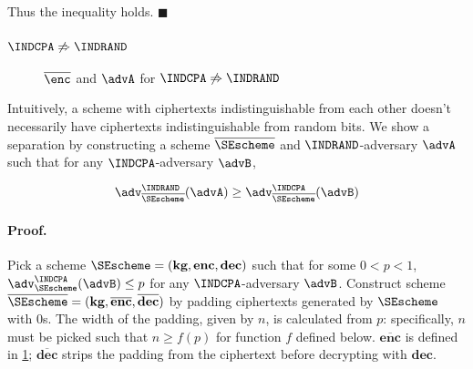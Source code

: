 Thus the inequality holds. $\blacksquare$

\subsubsection*{$\INDCPA \not\Rightarrow \INDRAND$}

\begin{figure}[p]
	\centering
  \caption{$\overline{\enc}$ and $\advA$ for $\INDCPA \not\Rightarrow \INDRAND$}
  \label{fig:cpa-rand-separation}
\end{figure}

Intuitively, a scheme with ciphertexts indistinguishable from each other
doesn't necessarily have ciphertexts indistinguishable from random bits.
We show a separation by constructing a scheme $\overline{\SEscheme}$ and
$\INDRAND$-adversary $\advA$ such that for any $\INDCPA$-adversary $\advB$,

$$
\adv_{\overline{\SEscheme}}^{\INDRAND}(\advA) \geq
\adv_{\overline{\SEscheme}}^{\INDCPA}(\advB)
$$

\paragraph{Proof.}

Pick a scheme $\SEscheme = (\textbf{kg},\textbf{enc},\textbf{dec})$
such that for some $0 < p < 1$, $\adv_{\SEscheme}^{\INDCPA}(\advB) \leq p$
for any $\INDCPA$-adversary $\advB$.
Construct scheme
$\overline{\SEscheme} = (\textbf{kg},\overline{\textbf{enc}},\overline{\textbf{dec}})$
by padding ciphertexts generated by $\SEscheme$ with 0s. The width of the
padding, given by $n$, is calculated from $p$: specifically, $n$ must be picked
such that $n \geq f(p)$ for function $f$ defined below.
$\overline{\textbf{enc}}$ is defined in \cref{fig:cpa-rand-separation};
$\overline{\textbf{dec}}$ strips the padding from the ciphertext before
decrypting with $\textbf{dec}$.

